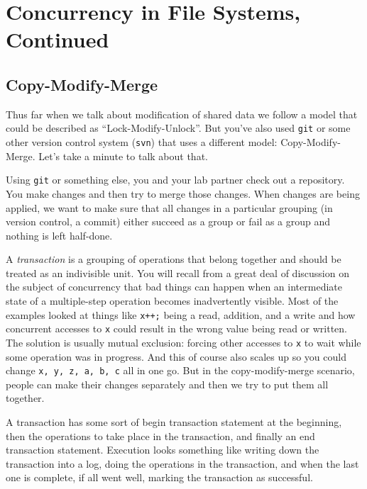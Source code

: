 




\section*{Concurrency in File Systems, Continued}

\subsection*{Copy-Modify-Merge}
Thus far when we talk about modification of shared data we follow a model that could be described as ``Lock-Modify-Unlock''. But you've also used \texttt{git} or some other version control system (\texttt{svn}) that uses a different model: Copy-Modify-Merge. Let's take a minute to talk about that.

Using \texttt{git} or something else, you and your lab partner check out a repository. You make changes and then try to merge those changes. When changes are being applied, we want to make sure that all changes in a particular grouping (in version control, a commit) either succeed as a group or fail as a group and nothing is left half-done.

A \textit{transaction} is a grouping of operations that belong together and should be treated as an indivisible unit. You will recall from a great deal of discussion on the subject of concurrency that bad things can happen when an intermediate state of a multiple-step operation becomes inadvertently visible. Most of the examples looked at things like \texttt{x++;} being a read, addition, and a write and how concurrent accesses to \texttt{x} could result in the wrong value being read or written. The solution is usually mutual exclusion: forcing other accesses to \texttt{x} to wait while some operation was in progress. And this of course also scales up so you could change \texttt{x, y, z, a, b, c} all in one go. But in the copy-modify-merge scenario, people can make their changes separately and then we try to put them all together.

A transaction has some sort of begin transaction statement at the beginning, then the operations to take place in the transaction, and finally an end transaction statement. Execution looks something like writing down the transaction into a log, doing the operations in the transaction, and when the last one is complete, if all went well, marking the transaction as successful. 

